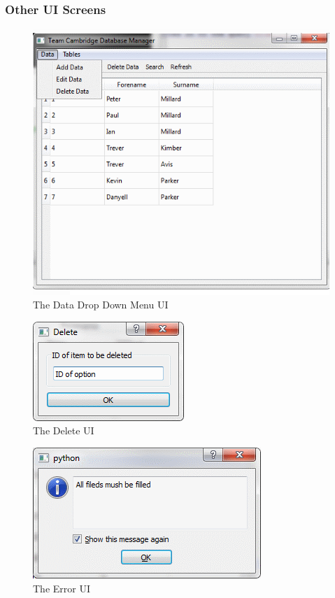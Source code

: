 \subsubsection{Other UI Screens}

\begin{figure}[H]
\includegraphics{./Maintenance/UI/DataDrop.png}
\caption{The Data Drop Down Menu UI} \label{fig:DataDrop_UI}
\end{figure}

\begin{figure}[H]
\includegraphics{./Maintenance/UI/Delete.png}
\caption{The Delete UI} \label{fig:Delete_UI}
\end{figure}

\begin{figure}[H]
\includegraphics{./Maintenance/UI/Error.png}
\caption{The Error UI} \label{fig:Error_UI}
\end{figure}

